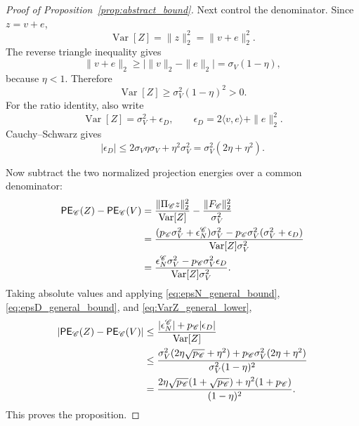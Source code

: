 \documentclass[11pt,letterpaper]{article}
\DeclareMathOperator{\Var}{Var}
\theoremstyle{remark}
\begin{document}
\begin{proof}[Proof of Proposition~\ref{prop:abstract_bound}]
Next control the denominator. Since $z=v+e$,
\begin{equation}
  \Var[Z]=\|z\|_2^2=\|v+e\|_2^2.
\end{equation}
The reverse triangle inequality gives
\begin{equation}
  \|v+e\|_2\geq\bigl|\|v\|_2-\|e\|_2\bigr|
  =\sigma_V(1-\eta),
\end{equation}
because $\eta<1$. Therefore
\begin{equation}
  \Var[Z]\geq\sigma_V^2(1-\eta)^2>0.
  \label{eq:VarZ_general_lower}
\end{equation}
For the ratio identity, also write
\begin{equation}
  \Var[Z]=\sigma_V^2+
  \epsilon_D,
  \qquad
  \epsilon_D=2\langle v,e\rangle+\|e\|_2^2.
\end{equation}
Cauchy--Schwarz gives
\begin{equation}
  |\epsilon_D|
  \leq 2\sigma_V\eta\sigma_V+
  \eta^2\sigma_V^2
  =\sigma_V^2(2\eta+
  \eta^2).
  \label{eq:epsD_general_bound}
\end{equation}

Now subtract the two normalized projection energies over a common denominator:
\begin{align}
  \mathsf{PE}_{\mathscr C}(Z)-\mathsf{PE}_{\mathscr C}(V)
  &=\frac{\|\Pi_{\mathscr C}z\|_2^2}{\Var[Z]}
    -\frac{\|F_{\mathscr C}\|_2^2}{\sigma_V^2}
  \notag\\
  &=\frac{(p_{\mathscr C}\sigma_V^2+\epsilon_N^{\mathscr C})\sigma_V^2
          -p_{\mathscr C}\sigma_V^2(\sigma_V^2+
          \epsilon_D)}{\Var[Z]\sigma_V^2}
  \notag\\
  &=\frac{\epsilon_N^{\mathscr C}\sigma_V^2
          -p_{\mathscr C}\sigma_V^2\epsilon_D}{\Var[Z]\sigma_V^2}.
  \label{eq:general_ratio_identity}
\end{align}
Taking absolute values and applying \eqref{eq:epsN_general_bound},
\eqref{eq:epsD_general_bound}, and \eqref{eq:VarZ_general_lower},
\begin{align}
  \left|\mathsf{PE}_{\mathscr C}(Z)-\mathsf{PE}_{\mathscr C}(V)\right|
  &\leq
  \frac{|\epsilon_N^{\mathscr C}|+p_{\mathscr C}|\epsilon_D|}{\Var[Z]}
  \notag\\
  &\leq
  \frac{
    \sigma_V^2(2\eta\sqrt{p_{\mathscr C}}+\eta^2)
    +p_{\mathscr C}\sigma_V^2(2\eta+\eta^2)
  }{\sigma_V^2(1-\eta)^2}
  \notag\\
  &=
  \frac{
    2\eta\sqrt{p_{\mathscr C}}(1+\sqrt{p_{\mathscr C}})
    +\eta^2(1+p_{\mathscr C})
  }{(1-\eta)^2}.
\end{align}
This proves the proposition.
\end{proof}
\end{document}
